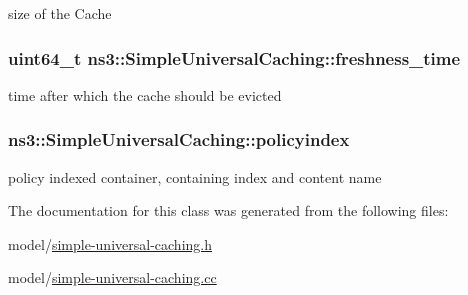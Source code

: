 size of the Cache 

\hypertarget{classns3_1_1SimpleUniversalCaching_ab7a35c71985c4567f09db5e21decc14b}{
\subsubsection[{freshness\-\_\-time}]{\setlength{\rightskip}{0pt plus 5cm}uint64\-\_\-t ns3\-::\-Simple\-Universal\-Caching\-::freshness\-\_\-time\hspace{0.3cm}{\ttfamily [private]}}}\label{classns3_1_1SimpleUniversalCaching_ab7a35c71985c4567f09db5e21decc14b}


time after which the cache should be evicted 

\hypertarget{classns3_1_1SimpleUniversalCaching_a500ad999484b695f8e7acaf07b6baf96}{
\subsubsection[{policyindex}]{ ns3\-::\-Simple\-Universal\-Caching\-::policyindex\hspace{0.3cm}{\ttfamily [private]}}}\label{classns3_1_1SimpleUniversalCaching_a500ad999484b695f8e7acaf07b6baf96}


policy indexed container, containing index and content name 



The documentation for this class was generated from the following files\-:\begin{DoxyCompactItemize}
\item 
model/\hyperlink{simple-universal-caching_8h}{simple-\/universal-\/caching.\-h}\item 
model/\hyperlink{simple-universal-caching_8cc}{simple-\/universal-\/caching.\-cc}\end{DoxyCompactItemize}
